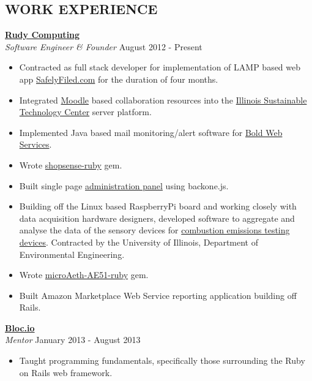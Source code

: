\documentclass[margin]{res}
\begin{document}
\begin{resume}
\vspace{-2mm}
\section{ WORK EXPERIENCE} 
  {\bf \href{http://www.rudycomputing.io/}{Rudy Computing}}\\
  {\sl Software Engineer \& Founder} \hfill August 2012 - Present
  
\vspace{-5mm}
  \begin{itemize}
    \itemsep -2pt %
    \item Contracted as full stack developer for implementation of LAMP based web app \href{https://safelyfiled.com/home/}{SafelyFiled.com} for the duration of four months.
    \item Integrated \href{https://moodle.org/}{Moodle} based collaboration resources into the \href{http://www.istc.illinois.edu/}{Illinois Sustainable Technology Center} server platform.
    \item Implemented Java based mail monitoring/alert software for \href{http://www.boldwebservices.com/}{Bold Web Services}.
    \item Wrote \href{http://rudycomputing.github.io/shopsense-ruby/}{shopsense-ruby} gem.
    \item Built single page \href{http://pure-refuge-1784.herokuapp.com/}{administration panel} using backone.js.
    \item Building off the Linux based RaspberryPi board and working closely with data acquisition hardware designers, developed software to aggregate and analyse the data of the sensory devices for \href{https://github.com/RudyComputing/CombustionEmissionsTesting}{combustion emissions testing devices}.  Contracted by the University of Illinois, Department of Environmental Engineering.
    \item Wrote \href{https://github.com/RudyComputing/microAeth-AE51-Ruby}{microAeth-AE51-ruby} gem.
    \item Built Amazon Marketplace Web Service reporting application building off Rails.
  \end{itemize}
 
  {\bf \href{https://www.bloc.io/}{Bloc.io}}\\
  {\sl Mentor} \hfill January 2013 - August 2013
\vspace{-5mm}
    \begin{itemize}  
        \item Taught programming fundamentals, specifically those
        surrounding the Ruby on Rails web framework.
     \end{itemize} 

\end{resume}
\end{document}

